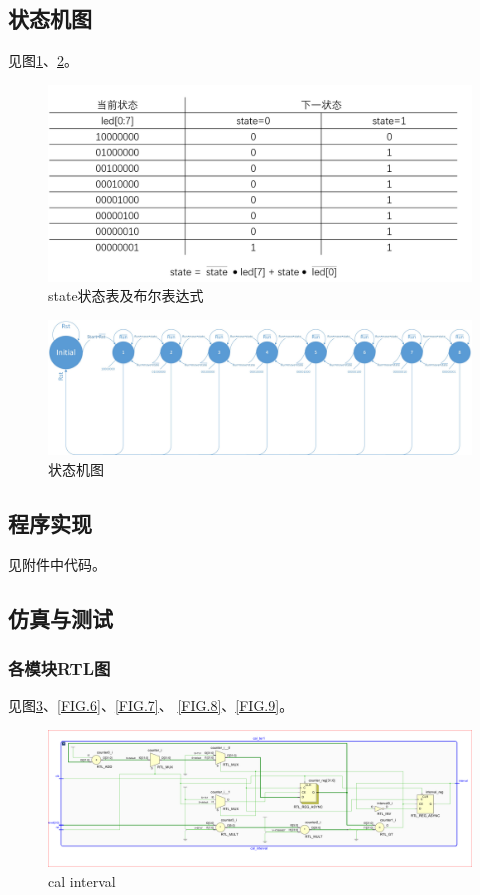\documentclass[UTF8]{article}
\begin{document}
\subsection{状态机图}
见图\ref{FIG.3}、\ref{FIG.4}。

\begin{figure}[H]
    \centering
    \includegraphics[scale=0.5]{state状态表及布尔表达式.PNG}
    \caption{state状态表及布尔表达式}
    \label{FIG.3}
\end{figure}

\begin{figure}[H]
    \centering
    \includegraphics[scale=0.2]{状态机图.jpg}
    \caption{状态机图}
    \label{FIG.4}
\end{figure}
\subsection{程序实现}

见附件中代码。

\subsection{仿真与测试}
\subsubsection{各模块RTL图}

见图\ref{FIG.5}、\ref{FIG.6}、\ref{FIG.7}、
\ref{FIG.8}、\ref{FIG.9}。
\begin{figure}[H]

    \centering
    \includegraphics[width=\linewidth]{cal_interval.PNG}
    \caption{cal interval}
    \label{FIG.5}
\end{figure}
\end{document}
